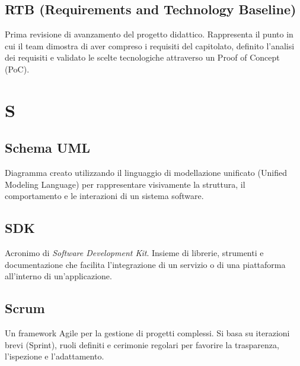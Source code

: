 \documentclass[a4paper, 11pt, oneside]{scrartcl} %
\begin{document}
\subsection*{RTB (Requirements and Technology Baseline)}
Prima revisione di avanzamento del progetto didattico. Rappresenta il punto in cui il team dimostra di aver compreso i requisiti del capitolato, definito l'analisi dei requisiti e validato le scelte tecnologiche attraverso un Proof of Concept (PoC).
\vspace{0.5cm}


\section*{S}


\subsection*{Schema UML}


Diagramma creato utilizzando il linguaggio di modellazione unificato (Unified Modeling Language) per rappresentare visivamente la struttura, il comportamento e le interazioni di un sistema software.

\vspace{0.5cm}

\subsection*{SDK}
Acronimo di \textit{Software Development Kit}. Insieme di librerie, strumenti e documentazione che facilita l'integrazione di un servizio o di una piattaforma all'interno di un'applicazione.
\vspace{0.5cm}

\subsection*{Scrum}
Un framework Agile per la gestione di progetti complessi. Si basa su iterazioni brevi (Sprint), ruoli definiti e cerimonie regolari per favorire la trasparenza, l'ispezione e l'adattamento.
\vspace{0.5cm}
\end{document}
